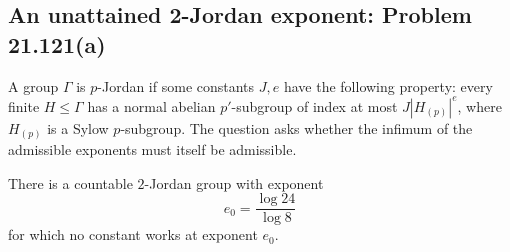\subsection{An unattained 2-Jordan exponent: Problem 21.121(a)}
\label{cand:21.121}

A group \(\Gamma\) is \(p\)-Jordan if some constants \(J,e\) have
the following property: every finite \(H\leq\Gamma\) has a normal
abelian \(p'\)-subgroup of index at most \(J|H_{(p)}|^e\), where
\(H_{(p)}\) is a Sylow \(p\)-subgroup. The question asks whether the
infimum of the admissible exponents must itself be admissible.

\begin{proposition}
There is a countable \(2\)-Jordan group with exponent
\[
 e_0=\frac{\log24}{\log8}
\]
for which no constant works at exponent \(e_0\).
\end{proposition}

